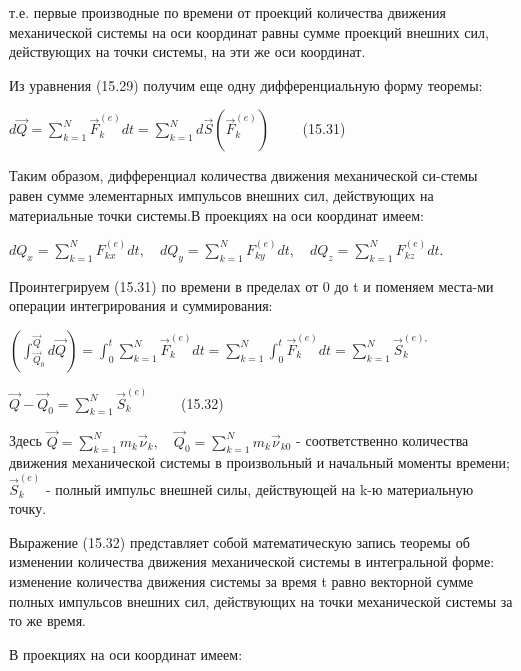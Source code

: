 {\begin{center}
    \par т.е. первые производные по времени от проекций количества движения механической системы на оси координат равны сумме проекций внешних сил, действующих на точки системы, на эти же оси координат.

    \par Из  уравнения  (15.29)  получим  еще  одну  дифференциальную  форму теоремы:

    \par $d\vec{Q} = \sum_{k=1}^{N} \vec{F}_{k}^{(e)}dt = \sum_{k=1}^{N} d\vec{S}(\vec{F}_{k}^{(e)}) \qquad$ (15.31)

    \par Таким образом, дифференциал количества движения механической си-стемы равен сумме элементарных импульсов внешних сил, действующих на материальные точки системы.В проекциях на оси координат имеем:

    \par $d{Q}_x = \sum_{k=1}^{N} {F}_{kx}^{(e)}dt, \quad
    d{Q}_y = \sum_{k=1}^{N} {F}_{ky}^{(e)}dt, \quad
    d{Q}_z = \sum_{k=1}^{N} {F}_{kz}^{(e)}dt.$

    \par Проинтегрируем (15.31) по времени в пределах от 0 до t и поменяем места-ми операции интегрирования и суммирования:

    \par  $(\int_{\vec{Q}_0}^{\vec{Q}} d\vec{Q} ) = \int_{0}^{t} \sum_{k=1}^{N} \vec{F}_{k}^{(e)}dt = 
    \sum_{k=1}^{N} \int_{0}^{t} \vec{F}_{k}^{(e)}dt =
    \sum_{k=1}^{N} \vec{S}_k^{(e),}$

    \par $\vec{Q} - \vec{Q}_0 = \sum_{k=1}^{N} \vec{S}_k^{(e)} \qquad$ (15.32)

    \par Здесь $\vec{Q}=\sum_{k=1}^{N} m_k \vec{\nu}_k, \quad
    \vec{Q}_0=\sum_{k=1}^{N} m_k \vec{\nu}_{k0}$ - соответственно количества движения механической системы в произвольный и начальный моменты времени; $\vec{S}_k^{(e)}$ - полный импульс внешней силы, действующей на k-ю материальную точку.

    \par Выражение (15.32) представляет собой математическую запись теоремы об изменении количества движения механической системы в интегральной форме:  изменение  количества  движения  системы  за  время  t  равно  векторной сумме полных импульсов внешних сил, действующих на точки механической системы за то же время.

    \par В проекциях на оси координат имеем:


\end{center}}
